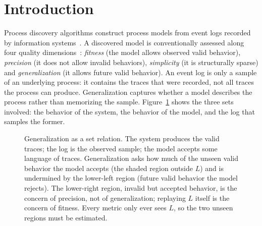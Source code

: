 \documentclass[runningheads]{llncs}
\begin{document}
\section{Introduction}
\label{sec:intro}

Process discovery algorithms construct process models from event logs recorded by information systems~\cite{vanderaalst2016pm}. A discovered model is conventionally assessed along four quality dimensions~\cite{buijs2014quality}: \emph{fitness} (the model allows observed valid behavior), \emph{precision} (it does not allow invalid behaviors), \emph{simplicity} (it is structurally sparse) and \emph{generalization} (it allows future valid behavior). An event log is only a sample of an underlying process: it contains the traces that were recorded, not all traces the process can produce. Generalization captures whether a model describes the process rather than memorizing the sample. Figure~\ref{fig:venn} shows the three sets involved: the behavior of the system, the behavior of the model, and the log that samples the former.

\begin{figure}[t]
\centering
{}
\caption{Generalization as a set relation. The system produces the valid traces; the log is the observed sample; the model accepts some language of traces. Generalization asks how much of the unseen valid behavior the model accepts (the shaded region outside $L$) and is undermined by the lower-left region (future valid behavior the model rejects). The lower-right region, invalid but accepted behavior, is the concern of precision, not of generalization; replaying $L$ itself is the concern of fitness. Every metric only ever sees $L$, so the two unseen regions must be estimated.}
\label{fig:venn}
\end{figure}
\end{document}
